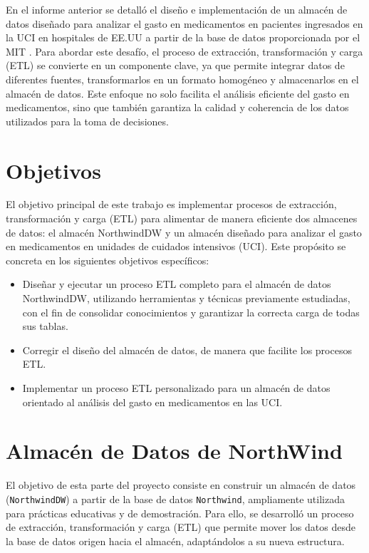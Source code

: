 \documentclass{article}
\begin{document}
En el informe anterior se detalló el diseño e implementación de un almacén de datos diseñado para analizar el gasto en medicamentos en pacientes ingresados en la UCI en hospitales de EE.UU a partir de la base de datos proporcionada por el MIT \cite{eicu_crd}. Para abordar este desafío, el proceso de extracción, transformación y carga (ETL) se convierte en un componente clave, ya que permite integrar datos de diferentes fuentes, transformarlos en un formato homogéneo y almacenarlos en el almacén de datos. Este enfoque no solo facilita el análisis eficiente del gasto en medicamentos, sino que también garantiza la calidad y coherencia de los datos utilizados para la toma de decisiones.

\section{Objetivos}
\label{sec:objetivos}

El objetivo principal de este trabajo es implementar procesos de extracción, transformación y carga (ETL) para alimentar de manera eficiente dos almacenes de datos: el almacén NorthwindDW y un almacén diseñado para analizar el gasto en medicamentos en unidades de cuidados intensivos (UCI). Este propósito se concreta en los siguientes objetivos específicos:

\begin{itemize}
	\item Diseñar y ejecutar un proceso ETL completo para el almacén de datos NorthwindDW, utilizando herramientas y técnicas previamente estudiadas, con el fin de consolidar conocimientos y garantizar la correcta carga de todas sus tablas.
	\item Corregir el diseño del almacén de datos, de manera que facilite los procesos ETL.
	\item Implementar un proceso ETL personalizado para un almacén de datos orientado al análisis del gasto en medicamentos en las UCI.
	
\end{itemize}

\section{Almacén de Datos de NorthWind}

 El objetivo de esta parte del proyecto consiste en construir un almacén de datos (\texttt{NorthwindDW}) a partir de la base de datos \texttt{Northwind}, ampliamente utilizada para prácticas educativas y de demostración. Para ello, se desarrolló un proceso de extracción, transformación y carga (ETL) que permite mover los datos desde la base de datos origen hacia el almacén, adaptándolos a su nueva estructura.
\end{document}
